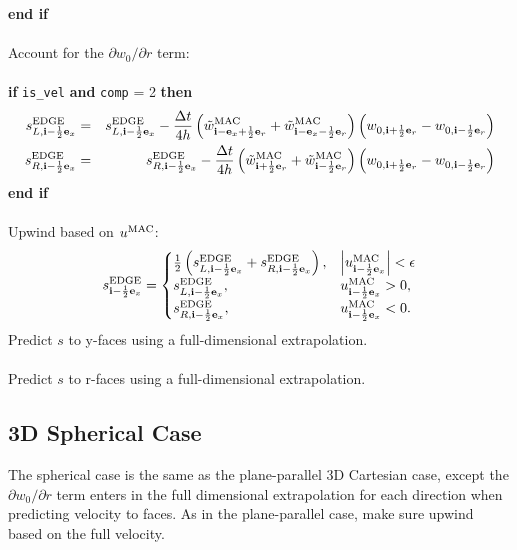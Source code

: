 {\bf end if}\\ \\
Account for the $\partial w_0/\partial r$ term:\\ \\
{\bf if} {\tt is\_vel} {\bf and} {\tt comp} = 2 {\bf then}
\begin{eqnarray}
s_{L,{\bf i}-\frac{1}{2}{\bf e}_x}^{\rm EDGE} &=& s_{L,{\bf i}-\frac{1}{2}{\bf e}_x}^{\rm EDGE} - 
\frac{\Delta t}{4h}\left(\tilde{w}^{\rm MAC}_{{\bf i}-{\bf e}_x+\frac{1}{2}{\bf e}_r} + \tilde{w}^{\rm MAC}_{{\bf i}-{\bf e}_x-\frac{1}{2}{\bf e}_r}\right)\left(w_{0,{\bf i}+\frac{1}{2}{\bf e}_r}-w_{0,{\bf i}-\frac{1}{2}{\bf e}_r}\right) \\
s_{R,{\bf i}-\frac{1}{2}{\bf e}_x}^{\rm EDGE} &=& s_{R,{\bf i}-\frac{1}{2}{\bf e}_x}^{\rm EDGE} -
\frac{\Delta t}{4h}\left(\tilde{w}^{\rm MAC}_{{\bf i}+\frac{1}{2}{\bf e}_r} + \tilde{w}^{\rm MAC}_{{\bf i}-\frac{1}{2}{\bf e}_r}\right)\left(w_{0,{\bf i}+\frac{1}{2}{\bf e}_r}-w_{0,{\bf i}-\frac{1}{2}{\bf e}_r}\right) \\
\end{eqnarray}
{\bf end if}\\ \\
Upwind based on $u^{\rm MAC}$:
\begin{equation}
s_{{\bf i}-\frac{1}{2}{\bf e}_x}^{\rm EDGE} =
\begin{cases}
\frac{1}{2}\left(s_{L,{\bf i}-\frac{1}{2}{\bf e}_x}^{\rm EDGE} + s_{R,{\bf i}-\frac{1}{2}{\bf e}_x}^{\rm EDGE}\right), & \left|u^{\rm MAC}_{{\bf i}-\frac{1}{2}{\bf e}_x}\right| < \epsilon \\
s_{L,{\bf i}-\frac{1}{2}{\bf e}_x}^{\rm EDGE}, & u^{\rm MAC}_{{\bf i}-\frac{1}{2}{\bf e}_x} > 0, \\
s_{R,{\bf i}-\frac{1}{2}{\bf e}_x}^{\rm EDGE}, & u^{\rm MAC}_{{\bf i}-\frac{1}{2}{\bf e}_x} < 0.
\end{cases}
\end{equation}
Predict $s$ to y-faces using a full-dimensional extrapolation.\\ \\
Predict $s$ to r-faces using a full-dimensional extrapolation.

\newpage

\subsection{3D Spherical Case}
The spherical case is the same as the plane-parallel 3D Cartesian 
case, except the $\partial w_0/\partial r$ term enters in the full 
dimensional extrapolation for each direction when predicting velocity 
to faces.  As in the plane-parallel case, make sure upwind based on 
the full velocity.

\newpage

